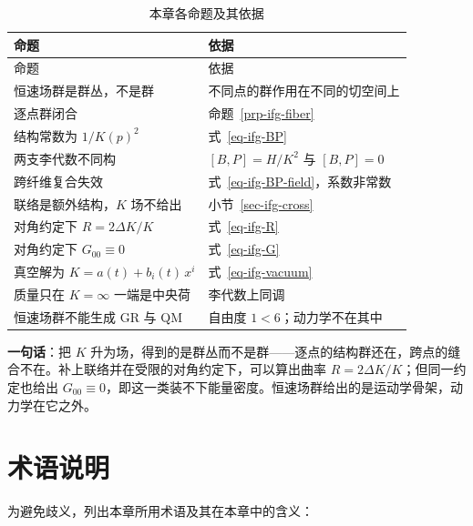 \documentclass[
  chinese,
  a4paper,
  UTF8,
  12pt,
  oneside,
  openany]{ctexbook}
\theoremstyle{plain}
\theoremstyle{plain}
\theoremstyle{plain}
\theoremstyle{definition}
\theoremstyle{plain}
\theoremstyle{plain}
\theoremstyle{remark}
\begin{document}
\begin{longtable}[]{@{}ll@{}}
\caption{本章各命题及其依据}\label{tbl-ifg-conclusion}\tabularnewline
\toprule\noalign{}
命题 & 依据 \\
\midrule\noalign{}
\endfirsthead
\toprule\noalign{}
命题 & 依据 \\
\midrule\noalign{}
\endhead
\bottomrule\noalign{}
\endlastfoot
恒速场群是群丛，不是群 & 不同点的群作用在不同的切空间上 \\
逐点群闭合 & 命题~\ref{prp-ifg-fiber} \\
结构常数为 \(1/K(p)^{2}\) & 式~\ref{eq-ifg-BP} \\
两支李代数不同构 & \([B,P]=H/K^{2}\) 与 \([B,P]=0\) \\
跨纤维复合失效 & 式~\ref{eq-ifg-BP-field}，系数非常数 \\
联络是额外结构，\(K\) 场不给出 & 小节~\ref{sec-ifg-cross} \\
对角约定下 \(R=2\Delta K/K\) & 式~\ref{eq-ifg-R} \\
对角约定下 \(G_{00}\equiv0\) & 式~\ref{eq-ifg-G} \\
真空解为 \(K=a(t)+b_i(t)\,x^{i}\) & 式~\ref{eq-ifg-vacuum} \\
质量只在 \(K=\infty\) 一端是中央荷 & 李代数上同调 \\
恒速场群不能生成 GR 与 QM & 自由度 \(1<6\)；动力学不在其中 \\
\end{longtable}

\textbf{一句话}：把 \(K\)
升为场，得到的是群丛而不是群------逐点的结构群还在，跨点的缝合不在。补上联络并在受限的对角约定下，可以算出曲率
\(R=2\Delta K/K\)；但同一约定也给出
\(G_{00}\equiv0\)，即这一类装不下能量密度。恒速场群给出的是运动学骨架，动力学在它之外。

\section{术语说明}\label{sec-ifg-terms}

为避免歧义，列出本章所用术语及其在本章中的含义：
\end{document}
